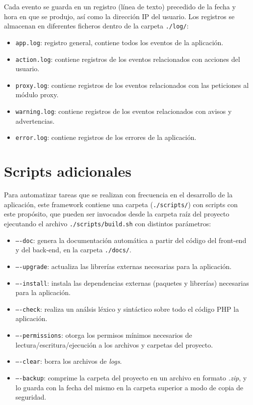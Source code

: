 Cada evento se guarda en un registro (línea de texto) precedido de la fecha y hora en que se produjo, así como la dirección IP del usuario. Los registros se almacenan en diferentes ficheros dentro de la carpeta \texttt{./log/}:
\begin{itemize}
  \item \texttt{app.log}: registro general, contiene todos los eventos de la aplicación.
  \item \texttt{action.log}: contiene registros de los eventos relacionados con acciones del usuario.
  \item \texttt{proxy.log}: contiene registros de los eventos relacionados con las peticiones al módulo proxy.
  \item \texttt{warning.log}: contiene registros de los eventos relacionados con avisos y advertencias.
  \item \texttt{error.log}: contiene registros de los errores de la aplicación.
\end{itemize}


\section{Scripts adicionales\label{extra:mvc:scripts}}

Para automatizar tareas que se realizan con frecuencia en el desarrollo de la aplicación, este \gls{framework} contiene una carpeta (\texttt{./scripts/}) con \glspl{script} con este propósito, que pueden ser invocados desde la carpeta raíz del proyecto ejecutando el archivo \texttt{./scripts/build.sh} con distintos parámetros:
\begin{itemize}
  \item \texttt{----doc}: genera la documentación automática a partir del código del \gls{front-end} y del \gls{back-end}, en la carpeta \texttt{./docs/}.
  \item \texttt{----upgrade}: actualiza las librerías externas necesarias para la aplicación.
  \item \texttt{----install}: instala las dependencias externas (paquetes y librerías) necesarias para la aplicación.
  \item \texttt{----check}: realiza un análsis léxico y sintáctico sobre todo el código \gls{PHP} la aplicación. 
  \item \texttt{----permissions}: otorga los permisos mínimos necesarios de lectura/escritura/ejecución a los archivos y carpetas del proyecto.
  \item \texttt{----clear}: borra los archivos de \textit{logs}.
  \item \texttt{----backup}: comprime la carpeta del proyecto en un archivo en formato \textit{.zip}, y lo guarda con la fecha del mismo en la carpeta superior a modo de copia de seguridad.
\end{itemize}

